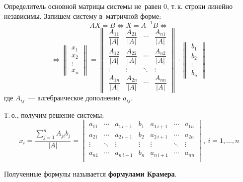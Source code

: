 Определитель основной матрицы системы не~равен 0, т.\,к. строки линейно независимы. Запишем систему в~матричной форме:
\begin{equation*}
AX = B \Leftrightarrow
X = A^{-1}B \Leftrightarrow
\end{equation*}
\begin{equation*}
\Leftrightarrow
\begin{Vmatrix}
x_1 \\
x_2 \\
\vdots \\
x_n
\end{Vmatrix} =
\begin{Vmatrix}
\dfrac{A_{11}}{|A|} & \dfrac{A_{21}}{|A|} & \cdots & \dfrac{A_{n1}}{|A|} \\
\dfrac{A_{12}}{|A|} & \dfrac{A_{22}}{|A|} & \cdots & \dfrac{A_{n2}}{|A|} \\
\vdots & \vdots & \ddots & \vdots \\
\dfrac{A_{1n}}{|A|} & \dfrac{A_{2n}}{|A|} & \cdots & \dfrac{A_{nn}}{|A|}
\end{Vmatrix} \cdot
\begin{Vmatrix}
b_1 \\
b_2 \\
\vdots \\
b_n
\end{Vmatrix}
\end{equation*}
где $A_{ij}$~--- алгебраическое дополнение $a_{ij}$.

Т.\,о., получим решение системы:
\begin{equation*}
\label{eq:Cramer's_formula}
x_i = \frac{\sum_{j=1}^n A_{ji} b_j}{|A|} =
\begin{vmatrix}
a_{11} & \cdots & a_{1\, i-1} & b_{1} & a_{1\, i+1} & \cdots & a_{1n} \\
a_{21} & \cdots & a_{2\, i-1} & b_{2} & a_{2\, i+1} & \cdots & a_{2n} \\
\vdots & \ddots & \vdots & \vdots & \vdots & \ddots & \vdots \\
a_{n1} & \cdots & a_{n\, i-1} & b_{n} & a_{n\, i+1} & \cdots & a_{nn} \\
\end{vmatrix}, \ i = 1, \ldots, n
\end{equation*}

Полученные формулы называется \textbf{формулами Крамера}.